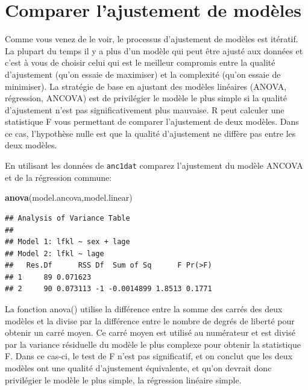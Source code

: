 \documentclass[12pt,]{book}
\makeatletter
\newenvironment{Shaded}{\begin{snugshade}}{\end{snugshade}}
\newcommand{\KeywordTok}[1]{\textcolor[rgb]{0.13,0.29,0.53}{\textbf{#1}}}
\newcommand{\NormalTok}[1]{#1}
\newenvironment{kframe}{%
\medskip{}
\setlength{\fboxsep}{.8em}
\def\at@end@of@kframe{}%
\ifinner\ifhmode%
 \def\at@end@of@kframe{\end{minipage}}%
 \begin{minipage}{\columnwidth}%
\fi\fi%
\def\FrameCommand##1{\hskip\@totalleftmargin \hskip-\fboxsep
\colorbox{incolor}{##1}\hskip-\fboxsep
    \hskip-\linewidth \hskip-\@totalleftmargin \hskip\columnwidth}%
\MakeFramed {\advance\hsize-\width
  \@totalleftmargin\z@ \linewidth\hsize
  \@setminipage}}%
{\par\unskip\endMakeFramed%
\at@end@of@kframe}
\newenvironment{rmdblock}[1]
 {
 \begin{itemize}
 \renewcommand{\labelitemi}{
   \raisebox{-.7\height}[0pt][0pt]{
     {\setkeys{Gin}{width=3em,keepaspectratio}\texttt{[image: images/\#1]}}
   }
 }
 \begin{kframe}
 \setlength{\fboxsep}{1em}
 \item
 }
 {
 \end{kframe}
 \end{itemize}
 }
\newenvironment{rmdcode}
  {\begin{rmdblock}{screen}}
  {\end{rmdblock}}
\makeatother
\begin{document}
\hypertarget{comparer-lajustement-de-moduxe8les}{%
\section{Comparer l'ajustement de modèles}\label{comparer-lajustement-de-moduxe8les}}

Comme vous venez de le voir, le processus d'ajustement de modèles est itératif. La plupart du temps il y a plus d'un modèle qui peut être ajusté aux données et c'est à vous de choisir celui qui est le meilleur compromis entre la qualité d'ajustement (qu'on essaie de maximiser) et la complexité (qu'on essaie de minimiser). La stratégie de base en ajustant des modèles linéaires (ANOVA, régression, ANCOVA) est de privilégier le modèle le plus simple si la qualité d'ajustement n'est pas significativement plus mauvaise. R peut calculer une statistique F vous permettant de comparer l'ajustement de deux modèles. Dans ce cas, l'hypothèse nulle est que la qualité d'ajustement ne diffère pas entre les deux modèles.

\begin{rmdcode}
En utilisant les données de \texttt{anc1dat} comparez l'ajustement du modèle ANCOVA et de la régression commune:
\end{rmdcode}

\begin{Shaded}
\begin{Highlighting}[]
\KeywordTok{anova}\NormalTok{(model.ancova,model.linear)}
\end{Highlighting}
\end{Shaded}

\begin{verbatim}
## Analysis of Variance Table
## 
## Model 1: lfkl ~ sex + lage
## Model 2: lfkl ~ lage
##   Res.Df      RSS Df  Sum of Sq      F Pr(>F)
## 1     89 0.071623                            
## 2     90 0.073113 -1 -0.0014899 1.8513 0.1771
\end{verbatim}

La fonction anova() utilise la différence entre la somme des carrés des deux modèles et la divise par la différence entre le nombre de degrés de liberté pour obtenir un carré moyen. Ce carré moyen est utilisé au numérateur et est divisé par la variance résiduelle du modèle le plus complexe pour obtenir la statistique F. Dans ce cas-ci, le test de F n'est pas significatif, et on conclut que les deux modèles ont une qualité d'ajustement équivalente, et qu'on devrait donc privilégier le modèle le plus simple, la régression linéaire simple.
\end{document}
